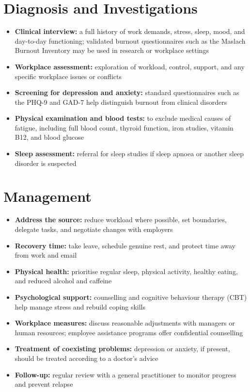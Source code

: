 \section*{Diagnosis and Investigations}
\begin{itemize}
    \item \textbf{Clinical interview:} a full history of work demands, stress, sleep, mood, and day-to-day functioning; validated burnout questionnaires such as the Maslach Burnout Inventory may be used in research or workplace settings
    \item \textbf{Workplace assessment:} exploration of workload, control, support, and any specific workplace issues or conflicts
    \item \textbf{Screening for depression and anxiety:} standard questionnaires such as the PHQ-9 and GAD-7 help distinguish burnout from clinical disorders
    \item \textbf{Physical examination and blood tests:} to exclude medical causes of fatigue, including full blood count, thyroid function, iron studies, vitamin B12, and blood glucose
    \item \textbf{Sleep assessment:} referral for sleep studies if sleep apnoea or another sleep disorder is suspected
\end{itemize}

\section*{Management}
\begin{itemize}
    \item \textbf{Address the source:} reduce workload where possible, set boundaries, delegate tasks, and negotiate changes with employers
    \item \textbf{Recovery time:} take leave, schedule genuine rest, and protect time away from work and email
    \item \textbf{Physical health:} prioritise regular sleep, physical activity, healthy eating, and reduced alcohol and caffeine
    \item \textbf{Psychological support:} counselling and cognitive behaviour therapy (CBT) help manage stress and rebuild coping skills
    \item \textbf{Workplace measures:} discuss reasonable adjustments with managers or human resources; employee assistance programs offer confidential counselling
    \item \textbf{Treatment of coexisting problems:} depression or anxiety, if present, should be treated according to a doctor's advice
    \item \textbf{Follow-up:} regular review with a general practitioner to monitor progress and prevent relapse
\end{itemize}

